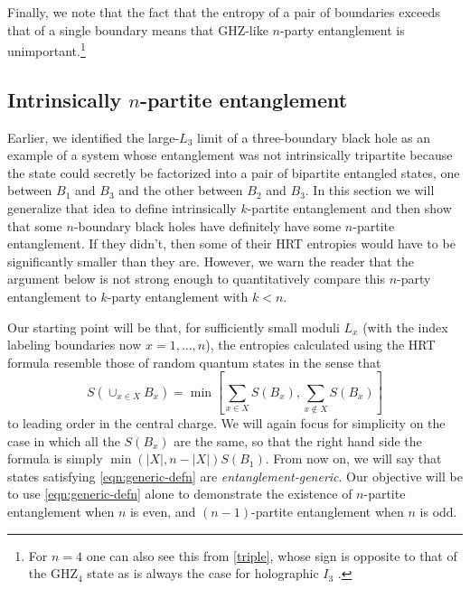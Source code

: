 \documentclass[12pt]{article}
\newcommand{\be}{\begin{equation}}
\newcommand{\ee}{\end{equation}}
\numberwithin{equation}{section}
\begin{document}
Finally, we note that the fact that the entropy of a pair of boundaries exceeds that of a single boundary means that GHZ-like $n$-party entanglement is unimportant.\footnote{For $n=4$ one can also see this from \eqref{triple}, whose sign is opposite to that of the GHZ${}_4$ state as is always the case for holographic $I_3$ \cite{hayden2013holographic}.}

\subsection{Intrinsically $n$-partite entanglement}
\label{intrinsic}

Earlier, we identified the large-$L_3$ limit of a three-boundary black hole as an example of a system whose entanglement was not intrinsically tripartite because the state could secretly be factorized into a pair of bipartite entangled states, one between $B_1$ and $B_3$ and the other between $B_2$ and $B_3$. In this section we will generalize that idea to define intrinsically $k$-partite entanglement and then show that some $n$-boundary black holes have definitely have some $n$-partite entanglement.  If they didn't, then some of their HRT entropies would have to be significantly smaller than they are. However, we warn the reader that the argument below is not strong enough to quantitatively compare this $n$-party entanglement to $k$-party entanglement with $k < n$.

Our starting point will be that, for sufficiently small moduli $L_x$  (with the index labeling boundaries now $x = 1,\dots, n$), the entropies calculated using the HRT formula resemble those of random quantum states in the sense that
\be \label{eqn:generic-defn}
S( \cup_{x \in X} B_x )
= \min \left[
	\sum_{x \in X} S(B_x), \sum_{x \not\in X} S(B_x)
	\right]
\ee
to leading order in the central charge. We will again focus for simplicity on the case in which all the $S(B_x)$ are the same, so that the right hand side the formula is simply $\min(|X|,n-|X|) S(B_1)$. From now on, we will say that states satisfying \eqref{eqn:generic-defn} are \emph{entanglement-generic}. Our objective will be to use \eqref{eqn:generic-defn} alone  to demonstrate the existence of $n$-partite entanglement when $n$ is even, and $(n-1)$-partite entanglement when $n$ is odd.
\end{document}
